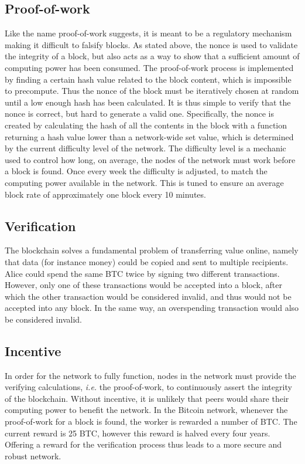 \subsection{Proof-of-work}
Like the name proof-of-work suggests, it is meant to be a regulatory mechanism making it difficult to falsify blocks. As stated above, the nonce is used to validate the integrity of a block, but also acts as a way to show that a sufficient amount of computing power has been consumed. The proof-of-work process is implemented by finding a certain hash value related to the block content, which is impossible to precompute. Thus the nonce of the block must be iteratively chosen at random until a low enough hash has been calculated. It is thus simple to verify that the nonce is correct, but hard to generate a valid one. Specifically, the nonce is created by calculating the hash of all the contents in the block with a function returning a hash value lower than a network-wide set value, which is determined by the current difficulty level of the network. The difficulty level is a mechanic used to control how long, on average, the nodes of the network must work before a block is found. Once every week the difficulty is adjusted, to match the computing power available in the network. This is tuned to ensure an average block rate of approximately one block every 10 minutes. 

\subsection{Verification}
The blockchain solves a fundamental problem of transferring value online, namely that data (for instance money) could be copied and sent to multiple recipients. Alice could spend the same BTC twice by signing two different transactions. However, only one of these transactions would be accepted into a block, after which the other transaction would be considered invalid, and thus would not be accepted into any block. In the same way, an overspending transaction would also be considered invalid.

\subsection{Incentive}
In order for the network to fully function, nodes in the network must provide the verifying calculations, \textit{i.e.} the proof-of-work, to continuously assert the integrity of the blockchain. Without incentive, it is unlikely that peers would share their computing power to benefit the network. In the Bitcoin network, whenever the proof-of-work for a block is found, the worker is rewarded a number of BTC. The current reward is 25 BTC, however this reward is halved every four years. Offering a reward for the verification process thus leads to a more secure and robust network.

